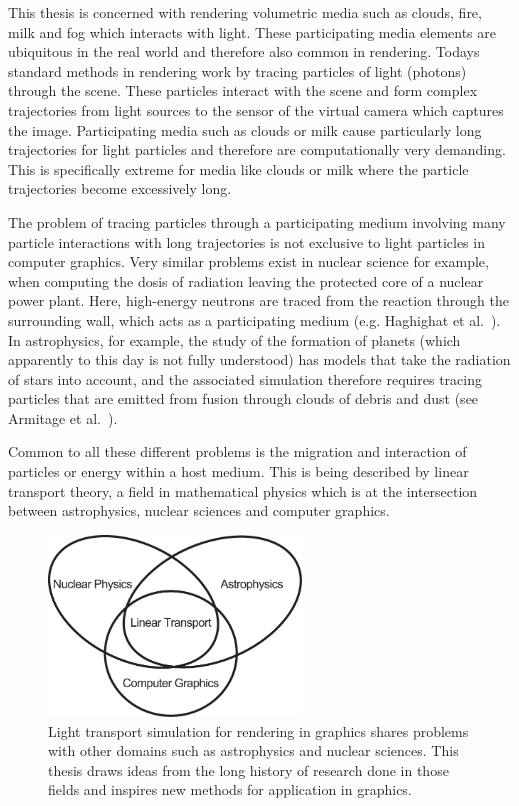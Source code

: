 This thesis is concerned with rendering volumetric media such as clouds, fire, milk and fog which interacts with light. These participating media elements are ubiquitous in the real world and therefore also common in rendering. Todays standard methods in rendering work by tracing particles of light (photons) through the scene. These particles interact with the scene and form complex trajectories from light sources to the sensor of the virtual camera which captures the image. Participating media such as clouds or milk cause particularly long trajectories for light particles and therefore are computationally very demanding. This is specifically extreme for media like clouds or milk where the particle trajectories become excessively long.


The problem of tracing particles through a participating medium involving many particle interactions with long trajectories is not exclusive to light particles in computer graphics. Very similar problems exist in nuclear science for example, when computing the dosis of radiation leaving the protected core of a nuclear power plant. Here, high-energy neutrons are traced from the reaction through the surrounding wall, which acts as a participating medium (e.g. Haghighat et al.~\cite{Haghighat03}). In astrophysics, for example, the study of the formation of planets (which apparently to this day is not fully understood) has models that take the radiation of stars into account, and the associated simulation therefore requires tracing particles that are emitted from fusion through clouds of debris and dust (see Armitage et al.~\cite{Armitage11}).

Common to all these different problems is the migration and interaction of particles or energy within a host medium. This is being described by linear transport theory, a field in mathematical physics which is at the intersection between astrophysics, nuclear sciences and computer graphics.
\begin{figure}[ht]
\centering
\includegraphics[width=0.6\textwidth]{02_Introduction/figures/fig_linear_transport.pdf}
\caption{Light transport simulation for rendering in graphics shares problems with other domains such as astrophysics and nuclear sciences. This thesis draws ideas from the long history of research done in those fields and inspires new methods for application in graphics.}
\label{fig:intro_linear_transport_fields}
\end{figure}

